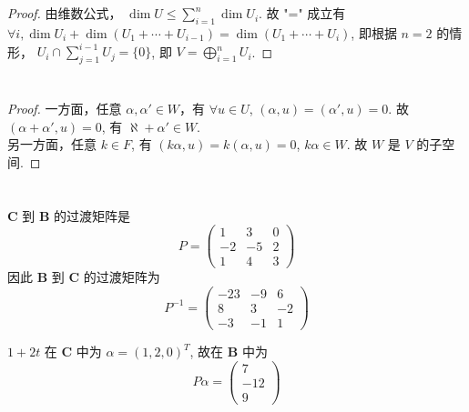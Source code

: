 \documentclass{article}
\begin{document}
\section{}

\begin{proof}
    由维数公式， $\dim U \leq \sum_{i = 1}^{n}\dim U_i$. 故 "=" 成立有 $\forall i, \dim U_i + \dim (U_1 + \cdots + U_{i - 1}) = \dim (U_1 + \cdots + U_i)$, 即根据 $n = 2$ 的情形， $U_i \cap \sum_{j = 1}^{i - 1}U_j = \{0\}$, 即 $V = \bigoplus_{i = 1}^{n}U_i$.
\end{proof}

\section{}

\begin{proof}
    一方面，任意 $\alpha, \alpha' \in W$，有 $\forall u \in U$, $(\alpha, u) = (\alpha', u) = 0$. 故 $(\alpha + \alpha', u) = 0$, 有 $\aleph + \alpha' \in W$. \\
    另一方面，任意 $k \in F$, 有 $(k\alpha, u) = k(\alpha, u) = 0$, $k\alpha \in W$. 故 $W$ 是 $V$ 的子空间.
\end{proof}

\section{}

$\mathbf{C}$ 到 $\mathbf{B}$ 的过渡矩阵是 
\[
    P = 
    \begin{pmatrix}
        1 & 3 & 0 \\
        -2 & -5 & 2 \\
        1 & 4 & 3
    \end{pmatrix}
\]
因此 $\mathbf{B}$ 到 $\mathbf{C}$ 的过渡矩阵为
\[
    P^{-1} = 
    \begin{pmatrix}
        -23 & -9 & 6 \\
        8 & 3 & -2 \\
        -3 & -1 & 1
    \end{pmatrix}
\]

$1 + 2t$ 在 $\mathbf{C}$ 中为 $\alpha = (1, 2, 0)^T$, 故在 $\mathbf{B}$ 中为
\[
    P\alpha = 
    \begin{pmatrix}
        7 \\ -12 \\ 9
    \end{pmatrix}
\]

\section{}
\end{document}

